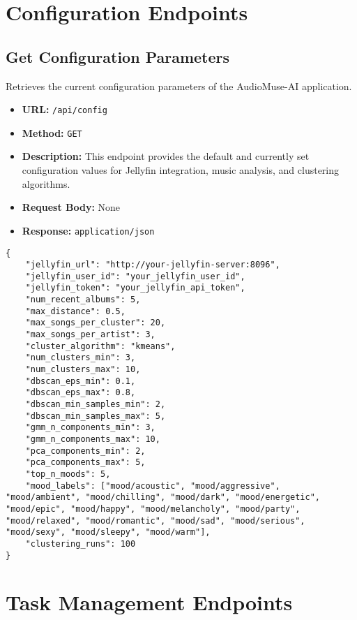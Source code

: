 \documentclass{article}
\begin{document}
\section{Configuration Endpoints}

\subsection{Get Configuration Parameters}
Retrieves the current configuration parameters of the AudioMuse-AI application.
\begin{itemize}[noitemsep]
    \item \textbf{URL:} \verb|/api/config|
    \item \textbf{Method:} \texttt{GET}
    \item \textbf{Description:} This endpoint provides the default and currently set configuration values for Jellyfin integration, music analysis, and clustering algorithms.
    \item \textbf{Request Body:} None
    \item \textbf{Response:} \texttt{application/json}
\end{itemize}

\lstset{language=json, caption=Example Response: Get Configuration Parameters}
\begin{lstlisting}
{
    "jellyfin_url": "http://your-jellyfin-server:8096",
    "jellyfin_user_id": "your_jellyfin_user_id",
    "jellyfin_token": "your_jellyfin_api_token",
    "num_recent_albums": 5,
    "max_distance": 0.5,
    "max_songs_per_cluster": 20,
    "max_songs_per_artist": 3,
    "cluster_algorithm": "kmeans",
    "num_clusters_min": 3,
    "num_clusters_max": 10,
    "dbscan_eps_min": 0.1,
    "dbscan_eps_max": 0.8,
    "dbscan_min_samples_min": 2,
    "dbscan_min_samples_max": 5,
    "gmm_n_components_min": 3,
    "gmm_n_components_max": 10,
    "pca_components_min": 2,
    "pca_components_max": 5,
    "top_n_moods": 5,
    "mood_labels": ["mood/acoustic", "mood/aggressive", "mood/ambient", "mood/chilling", "mood/dark", "mood/energetic", "mood/epic", "mood/happy", "mood/melancholy", "mood/party", "mood/relaxed", "mood/romantic", "mood/sad", "mood/serious", "mood/sexy", "mood/sleepy", "mood/warm"],
    "clustering_runs": 100
}
\end{lstlisting}

\section{Task Management Endpoints}
\end{document}
